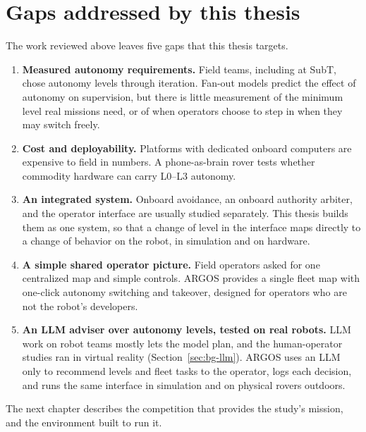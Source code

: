 \section{Gaps addressed by this thesis}
\label{sec:bg-gaps}

The work reviewed above leaves five gaps that this thesis targets.

\begin{enumerate}
\item \textbf{Measured autonomy requirements.}
  Field teams, including at SubT, chose autonomy levels through iteration.
  Fan-out models predict the effect of autonomy on supervision, but there is little measurement of the minimum level real missions need, or of when operators choose to step in when they may switch freely.
\item \textbf{Cost and deployability.}
  Platforms with dedicated onboard computers are expensive to field in numbers.
  A phone-as-brain rover tests whether commodity hardware can carry L0--L3 autonomy.
\item \textbf{An integrated system.}
  Onboard avoidance, an onboard authority arbiter, and the operator interface are usually studied separately.
  This thesis builds them as one system, so that a change of level in the interface maps directly to a change of behavior on the robot, in simulation and on hardware.
\item \textbf{A simple shared operator picture.}
  Field operators asked for one centralized map and simple controls.
  ARGOS provides a single fleet map with one-click autonomy switching and takeover, designed for operators who are not the robot's developers.
\item \textbf{An LLM adviser over autonomy levels, tested on real robots.}
  LLM work on robot teams mostly lets the model plan, and the human-operator studies ran in virtual reality (Section~\ref{sec:bg-llm}).
  ARGOS uses an LLM only to recommend levels and fleet tasks to the operator, logs each decision, and runs the same interface in simulation and on physical rovers outdoors.
\end{enumerate}

The next chapter describes the competition that provides the study's mission, and the environment built to run it.
